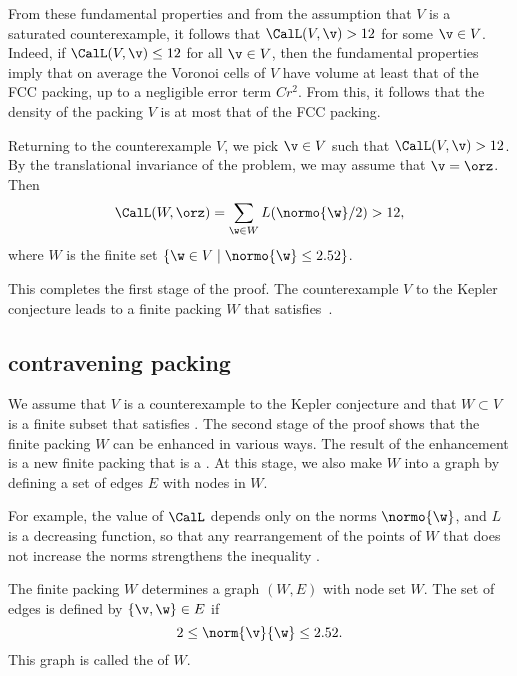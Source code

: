 From these fundamental properties and from the assumption that $V$ is a saturated counterexample,
it follows that $\CalL(V,\v)>12$ for some $\v\in V$.  Indeed, if $\CalL(V,\v)\le 12$ for all
$\v\in V$, then the fundamental properties
imply that on average the Voronoi cells of $V$ have volume at least that of the FCC packing, up to a negligible error term $C r^2$.  From this, it follows that the density
of the packing $V$ is at most that of the FCC packing.



Returning to the counterexample $V$, we pick $\v\in V$ such that
$\CalL(V,\v)>12$.  By the translational invariance of the problem, we
may assume that $\v=\orz$.  Then
\begin{equation}\label{eqn:LW}
\CalL(W,\orz) = \sum_{\w\in W} L(\normo{\w}/2)  > 12,
\end{equation}
where $W$ is the finite set  $\{\w\in V\mid \normo{\w} \le 2.52\}$.

This completes the first stage of the proof.
The counterexample $V$ to the Kepler conjecture leads to a finite packing $W$
that satisfies~.

\subsection{contravening packing}

We assume that $V$ is a counterexample to the Kepler conjecture and that $W\subset V$
is a finite subset that satisfies .
The second stage of the proof shows that the 
finite packing $W$ can be enhanced in various ways.  The result of the enhancement is
a new finite packing that is a .  At this stage, we also
make $W$ into a graph by defining a set of edges $E$ with nodes in $W$.

For example, the value of $\CalL$
depends only on the norms $\normo{\w}$, and $L$ is a decreasing
function, so that any rearrangement of the points of $W$ that does not
increase the norms strengthens the inequality .

The finite packing $W$ determines a graph $(W,E)$ with node set $W$.  The set
of edges is defined by $\{\v,\w\}\in E$ if 
\[2\le\norm{\v}{\w}\le 2.52.\] This graph is called the  of $W$.

